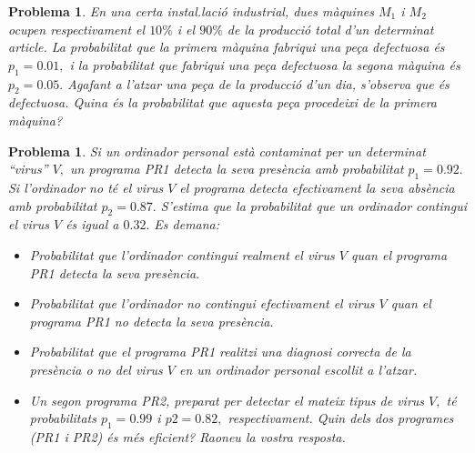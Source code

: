 \documentclass[11pt]{article}
\newcounter{prbcont}
\newtheorem{problema}[prbcont]{Problema}
\begin{document}
\begin{problema}
En una certa instal.laci\'o industrial, dues m\`aquines $M_1$ i $M_2$ ocupen respectivament el $10\%$ i el $90\%$ de la producci\'o total d'un determinat article. La probabilitat que la primera m\`aquina fabriqui una pe\c{c}a defectuosa \'es $p_1 = 0.01,$ i la probabilitat que fabriqui una pe\c{c}a defectuosa la segona m\`aquina \'es $p_2 = 0.05.$ Agafant a l'atzar una pe\c{c}a de la producci\'o d'un dia, s'observa que \'es defectuosa. Quina \'es la probabilitat
que aquesta pe\c{c}a procedeixi de la primera m\`aquina? %
\end{problema}


\begin{problema}
Si un ordinador personal est\`a contaminat per un determinat ``virus''  $V,$ un programa PR1 detecta la seva pres\`encia amb probabilitat $p_1 = 0.92.$ Si l'ordinador no t\'e el virus $V$ el programa detecta efectivament la seva abs\`encia amb probabilitat $p_2 = 0.87.$ S'estima que la probabilitat que un ordinador contingui el virus $V$ \'es igual a $0.32.$ Es demana:
\begin{itemize}
\item [(a)] Probabilitat que l'ordinador contingui realment el virus $V$ quan el programa PR1 detecta la seva pres\`encia. %
\item [(b)] Probabilitat que l'ordinador no contingui efectivament el virus $V$ quan el programa PR1 no detecta la seva pres\`encia. %
\item [(c)] Probabilitat que el programa PR1 realitzi una diagnosi correcta de la pres\`encia o no del virus $V$ en un ordinador personal escollit a l'atzar. %
\item [(d)] Un segon programa PR2, preparat per detectar el mateix tipus de virus $V,$ t\'e probabilitats $p_1 = 0.99$ i $p2 = 0.82,$ respectivament. Quin dels dos programes (PR1 i PR2) \'es m\'es eficient? Raoneu la vostra resposta. %
\end{itemize}
\end{problema}
\end{document}

